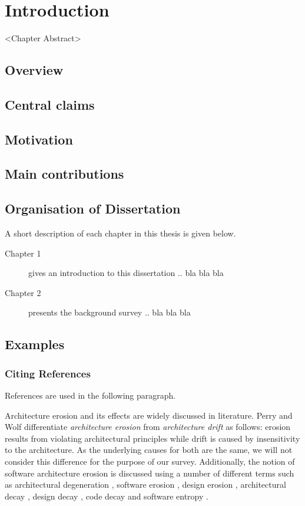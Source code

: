 %
%


\chapter{Introduction}
<Chapter Abstract>

\section{Overview}


\section{Central claims}


\section{Motivation}


\section{Main contributions}


\section{Organisation of Dissertation}
A short description of each chapter in this thesis is given below.

\begin{description}
\item[Chapter 1] gives an introduction to this dissertation .. bla bla bla

\item[Chapter 2] presents the background survey .. bla bla bla
\end{description}


\section{Examples}

\subsection{Citing References}
References are used in the following paragraph.

Architecture erosion and its effects are widely discussed in literature. Perry and Wolf \cite{Perry1992} differentiate \emph{architecture erosion} from \emph{architecture drift} as follows: erosion results from violating architectural principles while drift is caused by insensitivity to the architecture. As the underlying causes for both are the same, we will not consider this difference for the purpose of our survey. Additionally, the notion of software architecture erosion is discussed using a number of different terms such as architectural degeneration \cite{Hoch2003}, software erosion \cite{Dalgar2009}, design erosion \cite{Gurp2002}, architectural decay \cite{Riaz2009}, design decay \cite{Izur2007}, code decay \cite{Eick2001,String2006} and software entropy \cite{Jacob1992}. 



